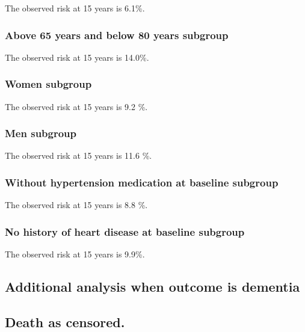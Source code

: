 \documentclass[
]{book}
\begin{document}
The observed risk at 15 years is 6.1\%.

\hypertarget{above-65-years-and-below-80-years-subgroup}{%
\subsubsection{Above 65 years and below 80 years subgroup}\label{above-65-years-and-below-80-years-subgroup}}

The observed risk at 15 years is 14.0\%.

\hypertarget{women-subgroup}{%
\subsubsection{Women subgroup}\label{women-subgroup}}

The observed risk at 15 years is 9.2 \%.

\hypertarget{men-subgroup}{%
\subsubsection{Men subgroup}\label{men-subgroup}}

The observed risk at 15 years is 11.6 \%.

\hypertarget{without-hypertension-medication-at-baseline-subgroup}{%
\subsubsection{Without hypertension medication at baseline subgroup}\label{without-hypertension-medication-at-baseline-subgroup}}

The observed risk at 15 years is 8.8 \%.

\hypertarget{no-history-of-heart-disease-at-baseline-subgroup}{%
\subsubsection{No history of heart disease at baseline subgroup}\label{no-history-of-heart-disease-at-baseline-subgroup}}

The observed risk at 15 years is 9.9\%.

\hypertarget{additional-analysis-when-outcome-is-dementia}{%
\subsection{Additional analysis when outcome is dementia}\label{additional-analysis-when-outcome-is-dementia}}

\hypertarget{death-as-censored.}{%
\subsection{Death as censored.}\label{death-as-censored.}}
\end{document}
